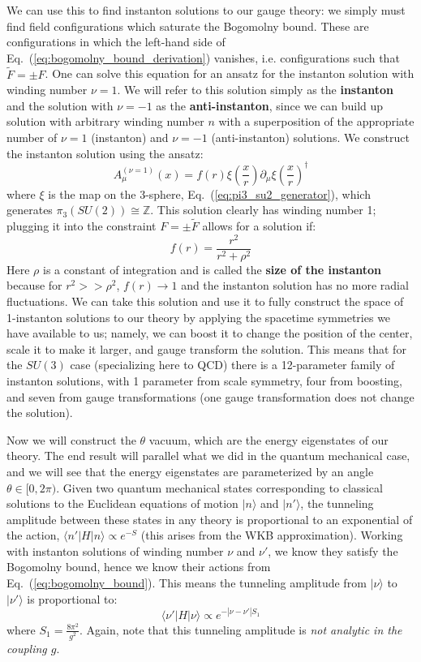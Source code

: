 \documentclass[11pt, oneside]{article}   	%
\theoremstyle{definition}
\begin{document}
We can use this to find instanton solutions to our gauge theory: we simply must find field configurations which saturate the Bogomolny bound. These are 
configurations in which the left-hand side of Eq.~(\ref{eq:bogomolny_bound_derivation}) vanishes, i.e. configurations such that $\tilde F = \pm F$. 
One can solve this equation for an ansatz for the instanton solution with winding number $\nu = 1$. We will refer to this solution simply as the \textbf{instanton} 
and the solution with $\nu = -1$ as the \textbf{anti-instanton}, since we can build up solution with arbitrary winding number $n$ with a superposition of the 
appropriate number of $\nu = 1$ (instanton) and $\nu = -1$ (anti-instanton) solutions. We construct the instanton solution using the ansatz:
\begin{equation}
	A_\mu^{(\nu = 1)}(x) = f(r) \xi\left(\frac{x}{r}\right) \partial_\mu \xi\left(\frac{x}{r}\right)^\dagger
\end{equation}
where $\xi$ is the map on the 3-sphere, Eq.~(\ref{eq:pi3_su2_generator}), which generates $\pi_3(SU(2))\cong\mathbb Z$. This solution 
clearly has winding number 1; plugging it into the constraint $F = \pm\tilde F$ allows for a solution if:
\begin{equation}
	f(r) = \frac{r^2}{r^2 + \rho^2}
\end{equation}
Here $\rho$ is a constant of integration and is called the \textbf{size of the instanton} because for $r^2 >> \rho^2$, $f(r)\rightarrow 1$ and the instanton 
solution has no more radial fluctuations. We can take this solution and use it to fully construct the space of 1-instanton solutions to our theory by applying 
the spacetime symmetries we have available to us; namely, we can boost it to change the position of the center, scale it to make it larger, and gauge transform 
the solution. This means that for the $SU(3)$ case (specializing here to QCD) there is a 12-parameter family of instanton solutions, with 1 parameter from 
scale symmetry, four from boosting, and seven from gauge transformations (one gauge transformation does not change the solution). 

Now we will construct the $\theta$ vacuum, which are the energy eigenstates of our theory. The end result will parallel what we did in the 
quantum mechanical case, and we will see that the energy eigenstates are parameterized by an angle $\theta\in [0, 2\pi)$. Given two 
quantum mechanical states corresponding to classical solutions to the Euclidean equations of motion $|n\rangle$ and $|n'\rangle$, the 
tunneling amplitude between these states in any theory is proportional to an exponential of the action, $\langle n' | H | n\rangle\propto 
e^{-S}$ (this arises from the WKB approximation). Working with instanton solutions of winding number $\nu$ and $\nu'$, we know they 
satisfy the Bogomolny bound, hence we know their actions from Eq.~(\ref{eq:bogomolny_bound}). This means the tunneling amplitude from 
$|\nu\rangle$ to $|\nu'\rangle$ is proportional to:
\begin{equation}
	\langle\nu' | H | \nu\rangle \propto e^{-|\nu - \nu'| S_1}
\end{equation}
where $S_1 = \frac{8\pi^2}{g^2}$. Again, note that this tunneling amplitude is \textit{not analytic in the coupling $g$}. 
\end{document}
